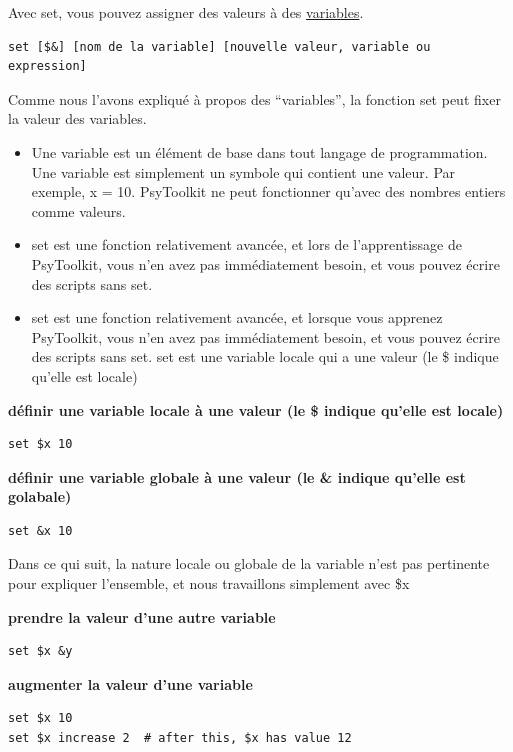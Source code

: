 \documentclass[
]{book}
\providecommand{\tightlist}{%
  \setlength{\itemsep}{0pt}\setlength{\parskip}{0pt}}
\begin{document}
Avec set, vous pouvez assigner des valeurs à des
\protect\hyperlink{variables-explained}{variables}.

\begin{verbatim}
set [$&] [nom de la variable] [nouvelle valeur, variable ou expression]
\end{verbatim}

Comme nous l'avons expliqué à propos des ``variables'', la fonction set
peut fixer la valeur des variables.

\begin{itemize}
\tightlist
\item
  Une variable est un élément de base dans tout langage de
  programmation. Une variable est simplement un symbole qui contient une
  valeur. Par exemple, x = 10. PsyToolkit ne peut fonctionner qu'avec
  des nombres entiers comme valeurs.
\item
  set est une fonction relativement avancée, et lors de l'apprentissage
  de PsyToolkit, vous n'en avez pas immédiatement besoin, et vous pouvez
  écrire des scripts sans set.
\item
  set est une fonction relativement avancée, et lorsque vous apprenez
  PsyToolkit, vous n'en avez pas immédiatement besoin, et vous pouvez
  écrire des scripts sans set. set est une variable locale qui a une
  valeur (le \$ indique qu'elle est locale)
\end{itemize}

\textbf{définir une variable locale à une valeur (le \$ indique qu'elle
est locale)}

\begin{verbatim}
set $x 10
\end{verbatim}

\textbf{définir une variable globale à une valeur (le \& indique qu'elle
est golabale)}

\begin{verbatim}
set &x 10
\end{verbatim}

Dans ce qui suit, la nature locale ou globale de la variable n'est pas
pertinente pour expliquer l'ensemble, et nous travaillons simplement
avec \$x

\textbf{prendre la valeur d'une autre variable}

\begin{verbatim}
set $x &y
\end{verbatim}

\textbf{augmenter la valeur d'une variable}

\begin{verbatim}
set $x 10
set $x increase 2  # after this, $x has value 12
\end{verbatim}
\end{document}
